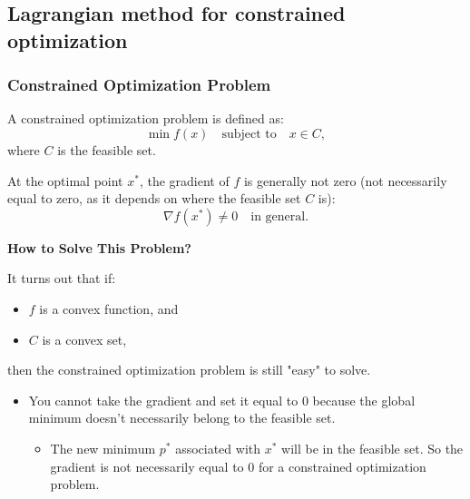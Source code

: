 \subsection{Lagrangian method for constrained optimization}
\subsubsection{Constrained Optimization Problem}
\begin{intuition}
    A constrained optimization problem is defined as:
    \[
    \min f(x) \quad \text{subject to} \quad x \in C,
    \]
    where \( C \) is the feasible set.

    At the optimal point \( x^* \), the gradient of \( f \) is generally not zero (not necessarily equal to zero, as it depends on where the feasible set $C$ is):
    \[
    \nabla f(x^*) \neq 0 \quad \text{in general}.
    \]

    \textbf{How to Solve This Problem?}

    It turns out that if:
    \begin{itemize}
        \item \( f \) is a convex function, and
        \item \( C \) is a convex set,
    \end{itemize}
    then the constrained optimization problem is still "easy" to solve.
\end{intuition}

\begin{warning}
    \begin{itemize}
        \item You cannot take the gradient and set it equal to 0 because the global minimum doesn't necessarily belong to the feasible set.
        \begin{itemize}
            \item The new minimum $p^*$ associated with $x^*$ will be in the feasible set. So the gradient is not necessarily equal to 0 for a constrained optimization problem.
        \end{itemize}
    \end{itemize}
\end{warning}

